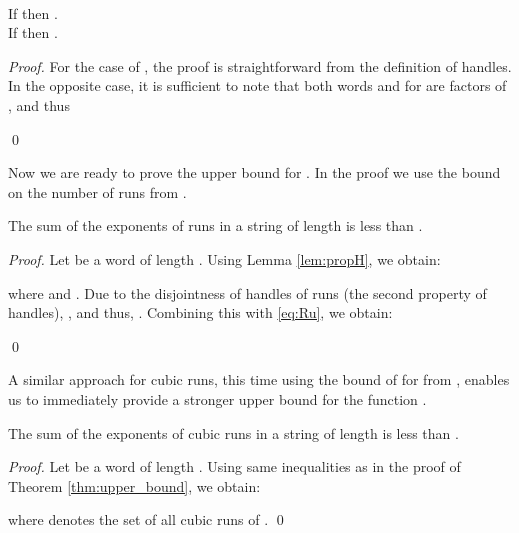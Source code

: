 \documentclass{llncs}
\begin{document}
    \begin{lemma}
      \label{lem:propH}~

    \noindent
      If  then
      .\\
      If  then
      .
    \end{lemma}

    \begin{proof}
      For the case of , the proof is straightforward from the definition of handles.
      In the opposite case, it is sufficient to note that both words
       and  for  are factors of , and thus
      
      \qed
    \end{proof}

    Now we are ready to prove the upper bound for .
    In the proof we use the bound  on the number of runs from \cite{DBLP:conf/cpm/CrochemoreIT08}.

    \begin{theorem}\label{thm:upper_bound}
      The sum of the exponents of runs in a string of length  is less than .
    \end{theorem}

    \begin{proof}
      Let  be a word of length .
      Using Lemma \ref{lem:propH}, we obtain:
      
      where  and .
      Due to the disjointness of handles of runs (the second property of handles), , and
      thus, .
      Combining this with \eqref{eq:Ru}, we obtain:
      
      \qed
    \end{proof}


    A similar approach for cubic runs, this time using the bound of  for  from \cite{Lata10},
    enables us to immediately provide a stronger upper bound for the function .

    \begin{theorem}
      The sum of the exponents of cubic runs in a string of length  is less than .
    \end{theorem}

    \begin{proof}
      Let  be a word of length .
      Using same inequalities as in the proof of Theorem \ref{thm:upper_bound}, we obtain:
      
      where  denotes the set of all cubic runs of .
      \qed
    \end{proof}


  
  
\end{document}
